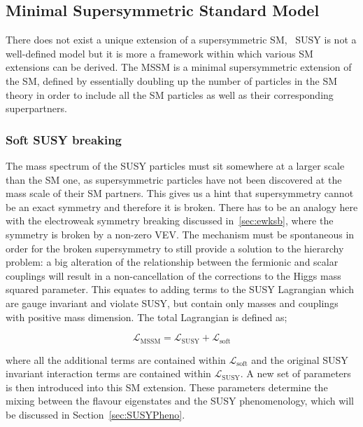 		\subsection{Minimal Supersymmetric Standard Model}
		\label{sec:MSSM}
			
			There does not exist a unique extension of a supersymmetric \ac{SM}, \ie\ \ac{SUSY} is not a well-defined model but it is more a framework within which various \ac{SM} extensions can be derived.
			The \ac{MSSM} is a minimal supersymmetric extension of the \ac{SM}, defined by essentially doubling up the number of particles in the \ac{SM} theory in order to include all the \ac{SM} particles as well as their corresponding superpartners.

			\subsubsection*{Soft SUSY breaking}
				
				The mass spectrum of the \ac{SUSY} particles must sit somewhere at a larger scale than the \ac{SM} one, as supersymmetric particles have not been discovered at the mass scale of their \ac{SM} partners. This gives us a hint that supersymmetry cannot be an exact symmetry and therefore it is broken. There has to be an analogy here with the electroweak symmetry breaking discussed in~\ref{sec:ewksb}, where the symmetry is broken by a non-zero \ac{VEV}. The mechanism must be spontaneous in order for the broken supersymmetry to still provide a solution to the hierarchy problem: a big alteration of the relationship between the fermionic and scalar couplings will result in a non-cancellation of the corrections to the Higgs mass squared parameter.
				This equates to adding terms to the \ac{SUSY} Lagrangian which are gauge invariant and violate \ac{SUSY}, but contain only masses and couplings with positive mass dimension. The total Lagrangian is defined as;

				\begin{equation}
				\label{eq:soft_sb}
					\mathcal L_{\mathrm{MSSM}} = \mathcal {L_{\mathrm{SUSY}}} + \mathcal {L_{\mathrm{soft}}}
				\end{equation}

				\noindent where all the additional terms are contained within $\mathcal {L_{\mathrm{soft}}}$ and the original \ac{SUSY} invariant interaction terms are contained within $\mathcal {L_{\mathrm{SUSY}}}$. A new set of parameters is then introduced into this \ac{SM} extension. These parameters determine the mixing between the flavour eigenstates and the \ac{SUSY} phenomenology, which will be discussed in Section~\ref{sec:SUSYPheno}. 

